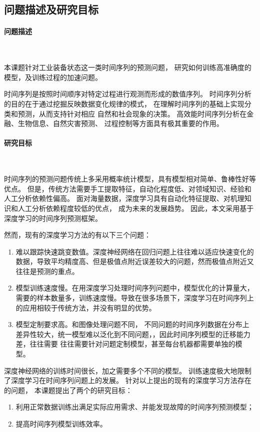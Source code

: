   \subsection{问题描述及研究目标}
  
  \paragraph{问题描述}~{}

  本课题针对工业装备状态这一类时间序列的预测问题，
  研究如何训练高准确度的模型，及训练过程的加速问题。

    时间序列是按照时间顺序对特定过程进行观测而形成的数值序列。
  时间序列分析的目的在于通过挖掘反映数据变化规律的模式，
  在理解时间序列的基础上实现分类和预测，从而支持针对相应
  自然和社会现象的决策。
  高效能时间序列分析在金融、生物信息、自然灾害预测、
  过程控制等方面具有极其重要的作用。

    
  \paragraph{研究目标}~{}\label{goal}

    时间序列的预测问题传统上多采用概率统计模型，具有模型相对简单、鲁棒性好等优点。
    但是，传统方法需要手工提取特征，自动化程度低、对领域知识、经验和人工分析依赖性偏高。
    面对海量数据，深度学习具有自动化特征提取、对机理知识和人工分析依赖程度较低的优点，
    成为未来的发展趋势。
    因此，本文采用基于深度学习的时间序列预测框架。

    然而，现有的深度学习方法的有以下三个问题：
    \begin{enumerate}
      \item 难以跟踪快速跳变数值。深度神经网络在回归问题上往往难以适应快速变化的数据，导致平均精度高、但是极值点附近误差较大的问题，然而极值点附近又往往是预测的重点。
      \item 模型训练速度慢。在用深度学习处理时间序列问题中，模型优化的计算量大，需要的样本数量多，训练速度慢。导致在很多场景下，深度学习在时间序列上的应用相较于传统方法，并没有明显的优势。
      \item 模型定制要求高。和图像处理问题不同，
      不同问题的时间序列数据在分布上差异性较大，统一模型难以泛化到不同问题，\cite{lebedev2018speeding}，因此时间序列模型的迁移能力差，往往需要      往往需要针对问题定制模型，甚至每台机器都需要单独的模型。
    \end{enumerate}

    深度神经网络的训练时间很长，加之需要多个不同的模型。
    训练速度极大地限制了深度学习在时间序列问题上的发展。
    针对以上提出的现有的深度学习方法存在的问题，
    本课题提出了两个的研究目标：
    \begin{enumerate}[(1)]
      \item 利用正常数据训练出满足实际应用需求、并能发现故障的时间序列预测模型；
      \item 提高时间序列模型训练效率。
    \end{enumerate}


